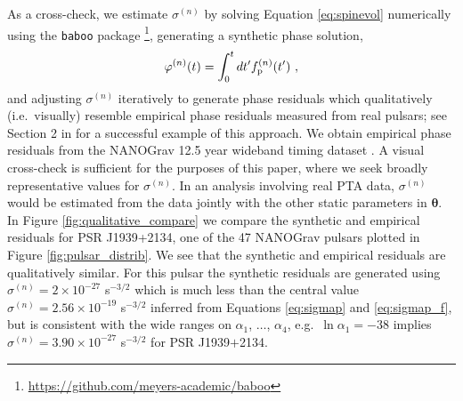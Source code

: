 \documentclass[fleqn,usenatbib,useAMS]{mnras}
\begin{document}
As a cross-check, we estimate $\sigma^{(n)}$ by solving Equation \eqref{eq:spinevol} numerically using the \texttt{baboo} package \footnote{\url{https://github.com/meyers-academic/baboo}}, generating a synthetic phase solution,
\begin{eqnarray}
	\varphi^{(n)}(t) = \int_0^t dt' f^{(n)}_{\rm p}(t') \ ,
\end{eqnarray}
and adjusting $\sigma^{(n)}$ iteratively to generate phase residuals which qualitatively (i.e.\ visually) resemble empirical phase residuals measured from real pulsars; see Section 2 in \cite{Vargas} for a successful example of this approach. We obtain empirical phase residuals from the NANOGrav 12.5 year wideband timing dataset \citep{pennucci_timothy_t_2020_4312887,nanogravwideband}. A visual cross-check is sufficient for the purposes of this paper, where we seek broadly representative values for $\sigma^{(n)}$. In an analysis involving real PTA data, $\sigma^{(n)}$ would be estimated from the data jointly with the other static parameters in ${\boldsymbol{\theta}}$. In Figure \ref{fig:qualitative_compare} we compare the synthetic and empirical residuals for PSR J1939+2134, one of the 47 NANOGrav pulsars plotted in Figure \ref{fig:pulsar_distrib}. We see that the synthetic and empirical residuals are qualitatively similar. For this pulsar the synthetic residuals are generated using $\sigma^{(n)} = 2 \times 10^{-27}$ s$^{-3/2}$ which is much less than the central value $\sigma^{(n)} = 2.56 \times 10^{-19}$ s$^{-3/2}$ inferred from Equations \eqref{eq:sigmap} and \eqref{eq:sigmap_f}, but is consistent with the wide ranges on $\alpha_1$, $\dots$, $\alpha_4$, e.g.\ $\ln \alpha_1 = -38$ implies $\sigma^{(n)}= 3.90 \times 10^{-27}$ s$^{-3/2}$ for PSR J1939$+$2134.

\end{document}
